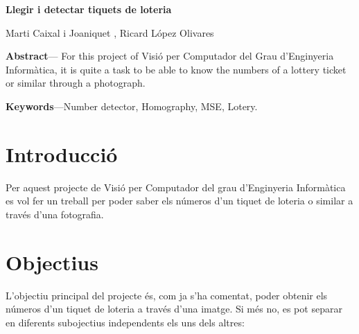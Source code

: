﻿\documentclass[10pt,a4paper,twocolumn,twoside]{article}
\begin{document}
{\sffamily
\noindent\textbf{\LARGE Llegir i detectar tiquets de loteria}
\begin{center}
Marti Caixal i Joaniquet , Ricard López Olivares 
\end{center}

\bigskip
\bigskip

\noindent 
\textbf{Abstract}--- For this project of Visió per Computador del Grau d’Enginyeria Informàtica, it is quite a task to be able to know the numbers of a lottery ticket or similar through a photograph.

\bigskip

\noindent 
\textbf{Keywords}---Number detector, Homography, MSE, Lotery.
}
\bigskip

{\vrule depth 0pt height 0.5pt width 3cm\hspace{7.5pt}%
%
\hspace{7.5pt}\vrule depth 0pt height 0.5pt width 3cm\relax}

\bigskip


\section{Introducció}

Per aquest projecte de Visió per Computador del grau d’Enginyeria Informàtica es vol fer un treball per poder saber els números d’un tiquet de loteria o similar a través d’una fotografia.

\section{Objectius}

L’objectiu principal del projecte és, com ja s’ha comentat, poder obtenir els números d’un tiquet de loteria a través d’una imatge. Si més no, es pot separar en diferents subojectius independents els uns dels altres:
\end{document}
